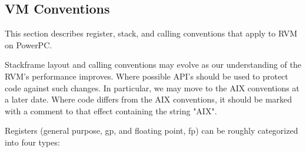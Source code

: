 \PowerPCTMFooter

\subsection{VM Conventions}

 \label{aix-conventions}
 \label{aix-conventions}


This section describes register, stack, and calling conventions that apply to 
RVM on PowerPC\PowerPCTMFootnote.

Stackframe layout and calling conventions may evolve as our understanding
of the RVM's performance improves.  Where possible API's should be used
to protect code against such changes.  In particular, we may move to
the AIX conventions at a later date.  Where code differs from the AIX
conventions, it should be marked with a comment to that effect containing
the string "AIX".


Registers (general purpose, gp, and floating point, fp) can be roughly
categorized into four types:

